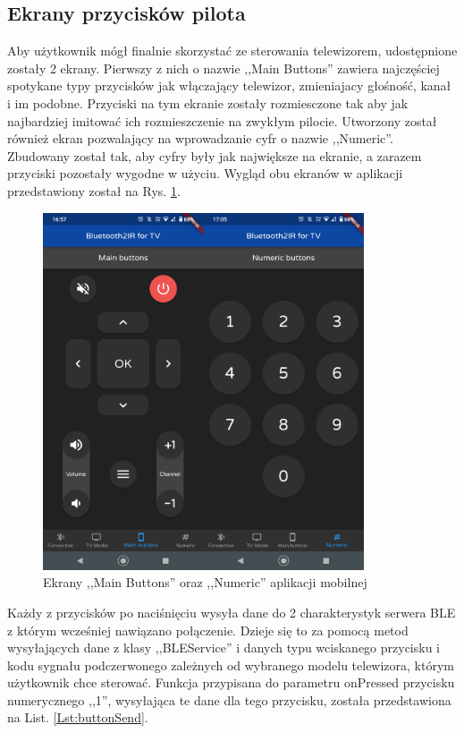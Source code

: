 \documentclass[12pt,twoside]{article}
\begin{document}
\subsection{Ekrany przycisków pilota}
Aby użytkownik mógł finalnie skorzystać ze sterowania telewizorem, udostępnione zostały 2 ekrany. Pierwszy z nich o nazwie ,,Main Buttons'' zawiera najczęściej spotykane typy przycisków jak włączający telewizor, zmieniajacy głośność, kanał i im podobne. Przyciski na tym ekranie zostały rozmiesczone tak aby jak najbardziej imitować ich rozmieszczenie na zwykłym pilocie. 
Utworzony został również ekran pozwalający na wprowadzanie cyfr o nazwie ,,Numeric''. Zbudowany został tak, aby cyfry były jak największe na ekranie, a zarazem przyciski pozostały wygodne w użyciu. Wygląd obu ekranów w aplikacji przedstawiony został na Rys. \ref*{Fig:buttonScreens}.

\begin{figure}[ht]
   \centering
   \includegraphics[width=9.5cm]{images/buttonScreens.png}
   \caption{Ekrany ,,Main Buttons'' oraz ,,Numeric'' aplikacji mobilnej}
   \label{Fig:buttonScreens}
\end{figure}

Każdy z przycisków po naciśnięciu wysyła dane do 2 charakterystyk serwera BLE z którym wcześniej nawiązano połączenie. Dzieje się to za pomocą metod wysyłających dane z klasy ,,BLEService'' i danych typu wciskanego przycisku i kodu sygnału podczerwonego zależnych od wybranego modelu telewizora, którym użytkownik chce sterować. Funkcja przypisana do parametru onPressed przycisku numerycznego ,,1'', wysyłająca te dane dla tego przycisku, została przedstawiona na List. \ref*{Lst:buttonSend}.
\end{document}
